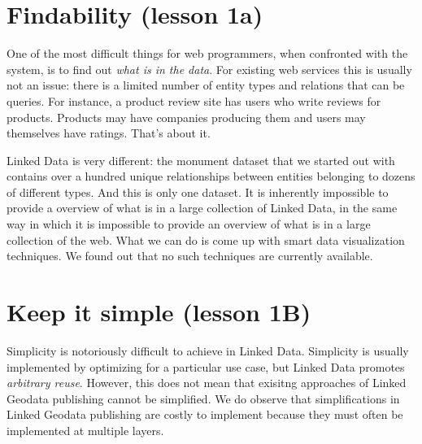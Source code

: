 \documentclass[a4paper]{scrartcl}
\begin{document}
\section{Findability (lesson 1a)}

One of the most difficult things for web programmers, when confronted
with the system, is to find out \emph{what is in the data}.  For
existing web services this is usually not an issue: there is a limited
number of entity types and relations that can be queries.  For
instance, a product review site has users who write reviews for
products.  Products may have companies producing them and users may
themselves have ratings.  That's about it.

Linked Data is very different: the monument dataset that we started
out with contains over a hundred unique relationships between entities
belonging to dozens of different types.  And this is only one dataset.
It is inherently impossible to provide a overview of what is in a
large collection of Linked Data, in the same way in which it is
impossible to provide an overview of what is in a large collection of
the web.  What we can do is come up with smart data visualization
techniques.  We found out that no such techniques are currently
available.

\section{Keep it simple (lesson 1B)}

Simplicity is notoriously difficult to achieve in Linked Data.
Simplicity is usually implemented by optimizing for a particular use
case, but Linked Data promotes \emph{arbitrary reuse}.  However, this
does not mean that exisitng approaches of Linked Geodata publishing
cannot be simplified.  We do observe that simplifications in Linked
Geodata publishing are costly to implement because they must often be
implemented at multiple layers.
\end{document}
